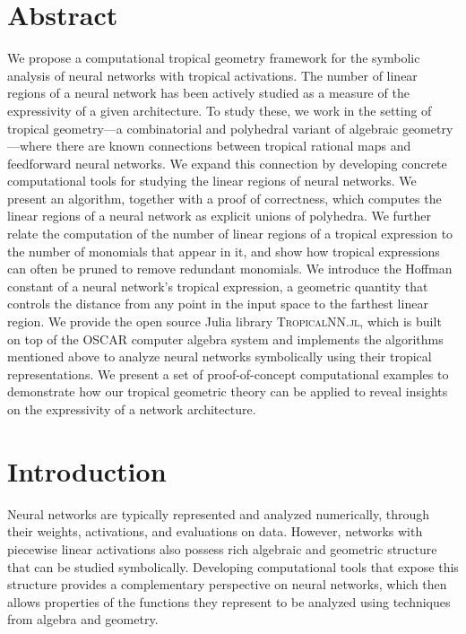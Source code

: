 \documentclass[10pt]{article}
\theoremstyle{definition}
\theoremstyle{remark}
\begin{document}
\section*{Abstract}
We propose a computational tropical geometry framework for the symbolic analysis of neural networks with tropical activations.
The number of linear regions of a neural network has been actively studied as a measure of the expressivity of a given architecture.
To study these, we work in the setting of tropical geometry---a combinatorial and polyhedral variant of algebraic geometry---where there are known connections between tropical rational maps and feedforward neural networks. 
We expand this connection by developing concrete computational tools for studying the linear regions of neural networks.
We present an algorithm, together with a proof of correctness, which computes the linear regions of a neural network as explicit unions of polyhedra. We further relate the computation of the number of linear regions of a tropical expression to the number of monomials that appear in it, and show how tropical expressions can often be pruned to remove redundant monomials.
We introduce the Hoffman constant of a neural network's tropical expression, a geometric quantity that controls the distance from any point in the input space to the farthest linear region. %
We provide the open source Julia library \textsc{TropicalNN.jl}, which is built on top of the OSCAR computer algebra system and implements the algorithms mentioned above to analyze neural networks symbolically using their tropical representations.
We present a set of proof-of-concept computational examples to demonstrate how our tropical geometric theory can be applied to reveal insights on the expressivity of a network architecture.

\section{Introduction}

Neural networks are typically represented and analyzed numerically, through their weights, activations, and evaluations on data.  However, networks with piecewise linear activations also possess rich algebraic and geometric structure that can be studied symbolically.  Developing computational tools that expose this structure provides a complementary perspective on neural networks, which then allows properties of the functions they represent to be analyzed using techniques from algebra and geometry.
\end{document}
